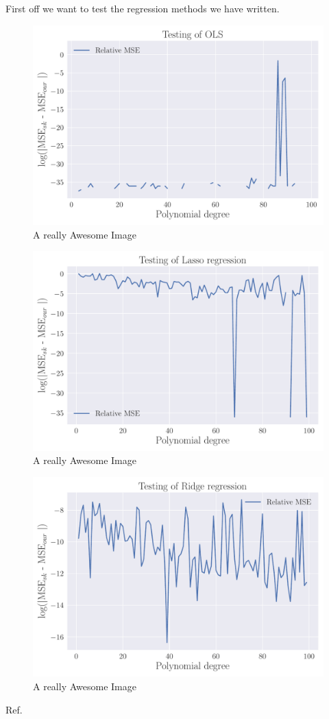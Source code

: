 \documentclass[reprint,english,notitlepage,aps,nobalancelastpage,nofootinbib]{revtex4-1}  %
\begin{document}
First off we want to test the regression methods we have written. 
\begin{figure}[!htb]
	\includegraphics[width=\linewidth]{Testing_OLS.pdf}
	\caption{A really Awesome Image}
	\label{fig:test_OLS}
\end{figure}
\begin{figure}[!htb]
	\includegraphics[width=\linewidth]{Testing_Lasso.pdf}
	\caption{A really Awesome Image}
	\label{fig:test_Lasso}
\end{figure}
\begin{figure}[!htb]
	\includegraphics[width=\linewidth]{Testing_Ridge.pdf}
	\caption{A really Awesome Image}
	\label{fig:test_ridge}
\end{figure}


\begin{thebibliography}{}
 Ref.

\end{thebibliography}
\end{document}
